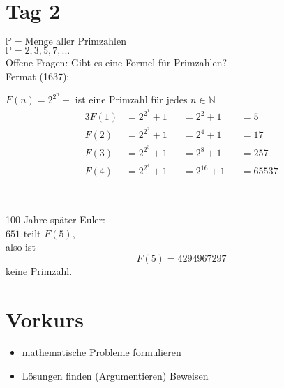 \documentclass[a4paper, markcase = upper, parskip = true, fleqn]{scrartcl}
\newcommand{\pardefs}{%
	\setlength{\parindent}{\myindent}%
	\setlength{\parskip}{\myparskip}%
}
\begin{document}
\section{Tag 2}
$\mathbb{P} = \text{Menge aller Primzahlen}$\\
$\mathbb{P} = {2, 3, 5, 7, ...}$\\
Offene Fragen: Gibt es eine Formel für Primzahlen?\\
Fermat (1637):\\
\begin{minipage}{0.5\textwidth}
	\setlength{\parindent}{1em}
	\begin{conjecturebox}
		$F(n) = 2^{2^n} + $ ist eine Primzahl für jedes $n \in \mathbb{N}$
		\begin{alignat*}{3}
			F(1) &= 2^{2^1} + 1 &&= 2^2 + 1 &&= 5\\
			F(2) &= 2^{2^2} + 1 &&= 2^4 + 1 &&= 17\\
			F(3) &= 2^{2^3} + 1 &&= 2^8 + 1 &&= 257\\
			F(4) &= 2^{2^4} + 1 &&= 2^16 + 1 &&= 65537
		\end{alignat*}
	\end{conjecturebox}
\end{minipage}
\begin{minipage}{0.05\textwidth}
	~
\end{minipage}
\begin{minipage}{0.4\textwidth}
	\pardefs
	100 Jahre später Euler:\\
	$651$ teilt $F(5)$,\\
	also ist
	\[F(5) = 4294967297\]
	\underline{keine} Primzahl.
\end{minipage}

\section{Vorkurs}
\begin{itemize}
	\item mathematische Probleme formulieren
	\item Lösungen finden (Argumentieren) Beweisen
\end{itemize}
\end{document}
